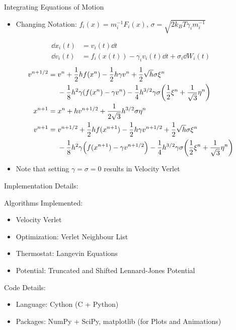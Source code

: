 \documentclass[10pt]{beamer}
\begin{document}
\begin{frame}[label={sec:org28aa89b}]{Integrating Equations of Motion}
\begin{itemize}
\item Changing Notation: \(f_i(x) = m_i^{-1}F_i(x)\), \(\sigma = \sqrt{2 k_B T \gamma_i m_i^{-1}}\)
\end{itemize}
\begin{align*}
\dd{x_i}(t) &= v_i(t)\dd{t}\\
\dd{v_i}(t) &= f_i(x(t)) - \gamma_i v_i(t) \dd{t} + \sigma_i \dd{W_i}(t)
\end{align*}
\begin{align}
v^{n+1/2} ={}&v^n + \frac{1}{2} h f(x^n) - \frac{1}{2} h \gamma v^n + \frac{1}{2} \sqrt{h} \sigma \xi^n \notag\\
&-\frac{1}{8} h^2 \gamma \pqty{f(x^n) - \gamma v^n} - \frac{1}{4} h^{3/2} \gamma \sigma \pqty{\frac{1}{2} \xi^n + \frac{1}{\sqrt{3}} \eta^n} \\
x^{n+1} ={}&x^n + h v^{n+1/2} + \frac{1}{2\sqrt{3}}h^{3/2} \sigma \eta^n \\
v^{n+1} ={}&v^{n+1/2} + \frac{1}{2} h f(x^{n+1}) - \frac{1}{2} h \gamma v^{n+1/2} + \frac{1}{2} \sqrt{h} \sigma \xi^n \notag\\
&-\frac{1}{8} h^2 \gamma \pqty{f(x^{n+1}) - \gamma v^{n+1/2}} - \frac{1}{4} h^{3/2} \gamma \sigma \pqty{\frac{1}{2} \xi^n + \frac{1}{\sqrt{3}} \eta^n}
\end{align}

\begin{itemize}
\item Note that setting \(\gamma = \sigma = 0\) results in Velocity Verlet
\end{itemize}
\end{frame}

\begin{frame}[label={sec:org6c523a1}]{Implementation Details:}
\begin{block}{Algorithms Implemented:}
\begin{itemize}
\item Velocity Verlet
\item Optimization: Verlet Neighbour List
\item Thermostat: Langevin Equations
\item Potential: Truncated and Shifted Lennard-Jones Potential
\end{itemize}
\end{block}
\begin{block}{Code Details:}
\begin{itemize}
\item Language: Cython (C + Python)
\item Packages: NumPy + SciPy, matplotlib (for Plots and Animations)
\end{itemize}
\end{block}
\end{frame}
\end{document}
